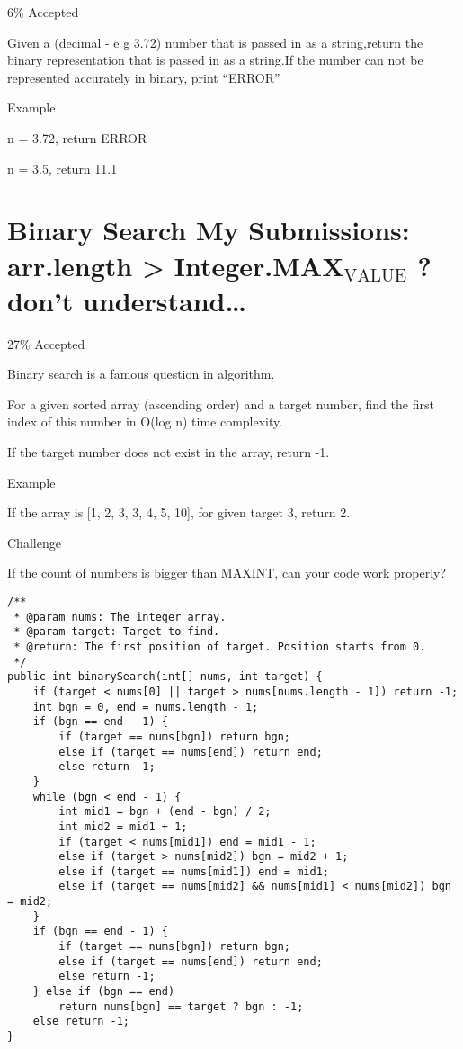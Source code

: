 \documentclass[12pt]{book}
\begin{document}
6\% Accepted

Given a (decimal - e g  3.72) number that is passed in as a string,return the binary representation that is passed in as a string.If the number can not be represented accurately in binary, print “ERROR”

Example

n = 3.72, return ERROR

n = 3.5, return 11.1
\chapter{Binary Search My Submissions: arr.length > Integer.MAX$_{\text{VALUE}}$ ? don't understand\ldots{}}
\label{sec-13}

27\% Accepted

Binary search is a famous question in algorithm.

For a given sorted array (ascending order) and a target number, find the first index of this number in O(log n) time complexity.

If the target number does not exist in the array, return -1.

Example

If the array is [1, 2, 3, 3, 4, 5, 10], for given target 3, return 2.

Challenge

If the count of numbers is bigger than MAXINT, can your code work
properly?

\lstset{language=java,label= ,caption= ,numbers=none}
\begin{lstlisting}
/**
 * @param nums: The integer array.
 * @param target: Target to find.
 * @return: The first position of target. Position starts from 0.
 */
public int binarySearch(int[] nums, int target) {
    if (target < nums[0] || target > nums[nums.length - 1]) return -1;
    int bgn = 0, end = nums.length - 1;
    if (bgn == end - 1) {
        if (target == nums[bgn]) return bgn;
        else if (target == nums[end]) return end;
        else return -1;
    }
    while (bgn < end - 1) {
        int mid1 = bgn + (end - bgn) / 2;
        int mid2 = mid1 + 1;
        if (target < nums[mid1]) end = mid1 - 1;
        else if (target > nums[mid2]) bgn = mid2 + 1;
        else if (target == nums[mid1]) end = mid1;
        else if (target == nums[mid2] && nums[mid1] < nums[mid2]) bgn = mid2;
    }
    if (bgn == end - 1) {
        if (target == nums[bgn]) return bgn;
        else if (target == nums[end]) return end;
        else return -1;
    } else if (bgn == end)
        return nums[bgn] == target ? bgn : -1;
    else return -1;
}
\end{lstlisting}
\end{document}
